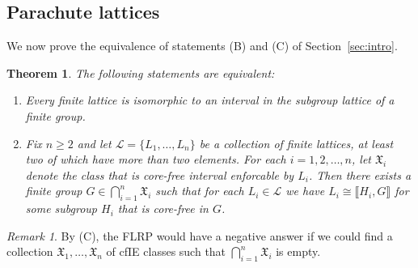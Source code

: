 \documentclass{gen-j-l}
\newcommand{\lb}{\ensuremath{\llbracket}}
\newcommand{\rb}{\ensuremath{\rrbracket}}
\newcommand{\<}{\ensuremath{\langle}}
\renewcommand{\>}{\ensuremath{\rangle}}
\theoremstyle{plain}
\newtheorem{theorem}{Theorem}[section]
\theoremstyle{definition}
\theoremstyle{remark}
\newtheorem*{remark}{Remark}
\numberwithin{theorem}{section}
\numberwithin{claim}{section}
\numberwithin{equation}{section}
\numberwithin{conjecture}{section}
\renewcommand{\leq}{\ensuremath{\leqslant}}
\renewcommand{\geq}{\ensuremath{\geqslant}}
\newcommand{\2}{\ensuremath{\mathbf{2}}}
\newcommand{\3}{\ensuremath{\mathbf{3}}}
\newcommand{\sG}{\ensuremath{\mathfrak{X}}}
\newcommand{\sL}{\ensuremath{\mathscr{L}}}
\begin{document}
\subsection{Parachute lattices}
\label{sec:parachute-lattices}
We now prove the equivalence of statements (B) and (C) 
of Section~\ref{sec:intro}.

\begin{theorem}
\label{thm-wjd-1}
The following statements are equivalent:
\begin{enumerate}
\item[(B)] Every finite lattice is isomorphic to
  an interval in the subgroup lattice of a finite group.

\item[(C)]
Fix $n\geq 2$ and let $\sL = \{L_1, \dots, L_n\}$ be a collection of
finite lattices, at least two of which have more than two elements.
For each $i = 1, 2, \dots, n$, let $\sG_i$ denote the class that is
core-free interval enforcable by $L_i$. Then there exists a finite group $G \in
\bigcap\limits_{i=1}^n \sG_i$ such that for 
each $L_i \in \sL$ we have $L_i\cong \lb H_i, G \rb$ for some subgroup
$H_i$ that is core-free in $G$. %
\end{enumerate}
\end{theorem}
\begin{remark}
By (C), the \acs{FLRP} would have a negative answer if we
could find a collection $\sG_1, \dots, \sG_n$ of \acs{cfIE} classes
such that $\bigcap\limits_{i=1}^n \sG_i$ is empty.
\end{remark}
\end{document}
